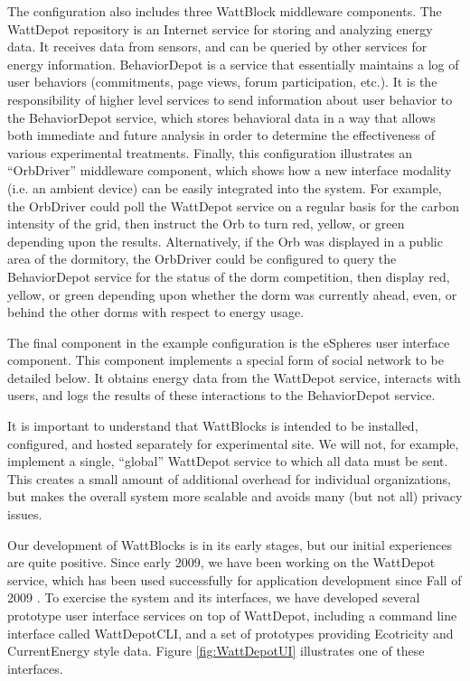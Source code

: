 The configuration also includes three WattBlock middleware components.  The
WattDepot repository is an Internet service for storing and analyzing
energy data.  It receives data from sensors, and can be queried by other
services for energy information.  BehaviorDepot is a service that
essentially maintains a log of user behaviors (commitments, page views,
forum participation, etc.).  It is the responsibility of higher level
services to send information about user behavior to the BehaviorDepot
service, which stores behavioral data in a way that allows both immediate
and future analysis in order to determine the effectiveness of various
experimental treatments.  Finally, this configuration illustrates an
``OrbDriver'' middleware component, which shows how a new interface
modality (i.e. an ambient device) can be easily integrated into the system.
For example, the OrbDriver could poll the WattDepot service on a regular
basis for the carbon intensity of the grid, then instruct the Orb to turn
red, yellow, or green depending upon the results. Alternatively, if the Orb
was displayed in a public area of the dormitory, the OrbDriver could be
configured to query the BehaviorDepot service for the status of the dorm
competition, then display red, yellow, or green depending upon whether the
dorm was currently ahead, even, or behind the other dorms with respect to
energy usage.

The final component in the example configuration is the eSpheres user
interface component.  This component implements a special form of social
network to be detailed below. It obtains energy data from the WattDepot service,
interacts with users, and logs the results of these interactions to the
BehaviorDepot service.

It is important to understand that WattBlocks is intended to be installed,
configured, and hosted separately for experimental site.  We will not, for
example, implement a single, ``global'' WattDepot service to which all data
must be sent.  This creates a small amount of additional overhead for
individual organizations, but makes the overall system more scalable and
avoids many (but not all) privacy issues.


Our development of WattBlocks is in its early stages, but our initial
experiences are quite positive.  Since early 2009, we have been working on
the WattDepot service, which has been used successfully for application
development since Fall of 2009 \cite{WattDepot}.  To exercise the system
and its interfaces, we have developed several prototype user interface
services on top of WattDepot, including a command line interface called
WattDepotCLI, and a set of prototypes providing Ecotricity and
CurrentEnergy style data.  Figure \ref{fig:WattDepotUI} illustrates one of
these interfaces.

